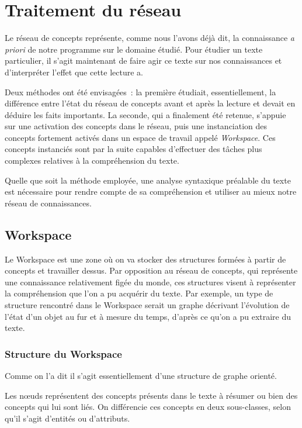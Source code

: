 \documentclass[a4paper, 12pt]{article}
\begin{document}
\section{Traitement du réseau}\label{Section:Traitement}

Le réseau de concepts représente, comme nous l'avons déjà dit, la connaissance \textit{a priori} de notre programme sur le domaine étudié. Pour étudier un texte particulier, il s'agit maintenant de faire agir ce texte sur nos connaissances et d'interpréter l'effet que cette lecture a.

Deux méthodes ont été envisagées~: la première étudiait, essentiellement, la différence entre l'état du réseau de concepts avant et après la lecture et devait en déduire les faits importants. La seconde, qui a finalement été retenue, s'appuie sur une activation des concepts dans le réseau, puis une instanciation des concepts fortement activés dans un espace de travail appelé \textit{Workspace}. Ces concepts instanciés sont par la suite capables d'effectuer des tâches plus complexes relatives à la compréhension du texte.

Quelle que soit la méthode employée, une analyse syntaxique préalable du texte est nécessaire pour rendre compte de sa compréhension et utiliser au mieux notre réseau de connaissances.

\subsection{Workspace}
Le Workspace est une zone où on va stocker des structures formées à partir de concepts et travailler dessus. Par opposition au réseau de concepts, qui représente une connaissance relativement figée du monde, ces structures visent à représenter la compréhension que l'on a pu acquérir du texte.
Par exemple, un type de structure rencontré dans le Workspace serait un graphe décrivant l'évolution de l'état d'un objet au fur et à mesure du temps, d'après ce qu'on a pu extraire du texte.

\subsubsection{Structure du Workspace}
Comme on l'a dit il s'agit essentiellement d'une structure de graphe orienté.

Les nœuds représentent des concepts présents dans le texte à résumer ou bien des concepts qui lui sont liés. On différencie ces concepts en deux sous-classes, selon qu'il s'agit d'entités ou d'attributs.
\end{document}
